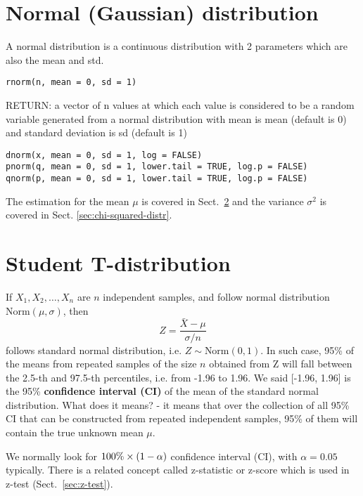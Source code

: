 \section{Normal (Gaussian) distribution}
\label{sec:norm-gauss-distr}

A normal distribution is a continuous distribution with 2 parameters
which are also the mean and std.
\begin{verbatim}
rnorm(n, mean = 0, sd = 1)
\end{verbatim}
RETURN: a vector of n values at which each value is considered to be a
random variable generated from a normal distribution with mean is mean
(default is 0) and standard deviation is sd (default is 1)

\begin{verbatim}
dnorm(x, mean = 0, sd = 1, log = FALSE)
pnorm(q, mean = 0, sd = 1, lower.tail = TRUE, log.p = FALSE)
qnorm(p, mean = 0, sd = 1, lower.tail = TRUE, log.p = FALSE)
\end{verbatim}


The estimation for the mean $\mu$ is covered in
Sect.~\ref{sec:stud-t-distr} and the variance $\sigma^2$ is covered in
Sect. \ref{sec:chi-squared-distr}. 

\section{Student T-distribution}
\label{sec:stud-t-distr}

If $X_1, X_2,\dots,X_n$ are $n$ independent samples, and follow normal
distribution $\text{Norm}(\mu,\sigma)$, then
\begin{equation}
  \label{eq:31}
  Z = \frac{\bar{X}-\mu}{\sigma/n}
\end{equation}
follows standard normal distribution, i.e. $Z\sim \text{Norm}(0,1)$.
In such case, 95\% of the means from repeated samples of the size $n$
obtained from Z will fall between the 2.5-th and 97.5-th percentiles,
i.e. from -1.96 to 1.96.  We said [-1.96, 1.96] is the 95\%
{\bf confidence interval (CI)} of the mean of the standard normal
distribution. What does it means? - it means that over the collection
of all 95\% CI that can be constructed from repeated independent
samples, 95\% of them will contain the true unknown mean $\mu$. 

\begin{framed}
  We normally look for $100\%\times (1-\alpha)$ confidence interval (CI), with
  $\alpha=0.05$ typically. There is a related concept called
  z-statistic or z-score which is used in z-test
  (Sect.~\ref{sec:z-test}).

\end{framed}

